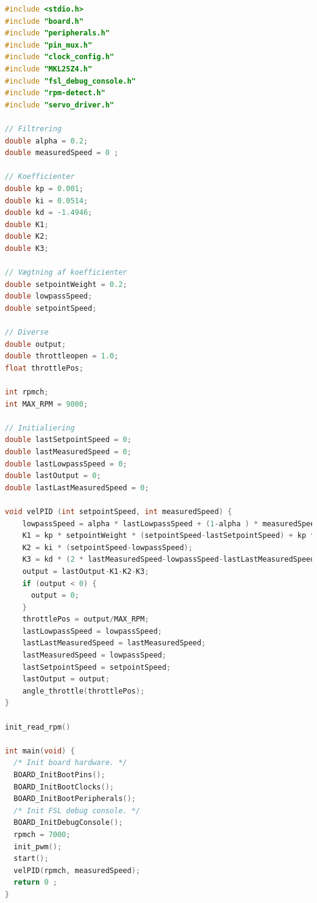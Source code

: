 \begin{lstlisting}[language=C,basicstyle=\ttfamily]
#include <stdio.h>
#include "board.h"
#include "peripherals.h"
#include "pin_mux.h"
#include "clock_config.h"
#include "MKL25Z4.h"
#include "fsl_debug_console.h"
#include "rpm-detect.h"
#include "servo_driver.h"

// Filtrering
double alpha = 0.2;
double measuredSpeed = 0 ;

// Koefficienter
double kp = 0.001;
double ki = 0.0514;
double kd = -1.4946;
double K1;
double K2;
double K3;

// Vægtning af koefficienter
double setpointWeight = 0.2;
double lowpassSpeed;
double setpointSpeed;

// Diverse
double output;
double throttleopen = 1.0;
float throttlePos;

int rpmch;
int MAX_RPM = 9000;

// Initialiering
double lastSetpointSpeed = 0;
double lastMeasuredSpeed = 0;
double lastLowpassSpeed = 0;
double lastOutput = 0;
double lastLastMeasuredSpeed = 0;

void velPID (int setpointSpeed, int measuredSpeed) {
    lowpassSpeed = alpha * lastLowpassSpeed + (1-alpha ) * measuredSpeed;
    K1 = kp * setpointWeight * (setpointSpeed-lastSetpointSpeed) + kp * (lastMeasuredSpeed-lowpassSpeed);
    K2 = ki * (setpointSpeed-lowpassSpeed);
    K3 = kd * (2 * lastMeasuredSpeed-lowpassSpeed-lastLastMeasuredSpeed);
    output = lastOutput-K1-K2-K3;
    if (output < 0) {
      output = 0;
    }
    throttlePos = output/MAX_RPM;
    lastLowpassSpeed = lowpassSpeed;
    lastLastMeasuredSpeed = lastMeasuredSpeed;
    lastMeasuredSpeed = lowpassSpeed;
    lastSetpointSpeed = setpointSpeed;
    lastOutput = output;
    angle_throttle(throttlePos);
}

init_read_rpm()

int main(void) {
  /* Init board hardware. */
  BOARD_InitBootPins();
  BOARD_InitBootClocks();
  BOARD_InitBootPeripherals();
  /* Init FSL debug console. */
  BOARD_InitDebugConsole();
  rpmch = 7000;
  init_pwm();
  start();
  velPID(rpmch, measuredSpeed);
  return 0 ;
}

\end{lstlisting}



